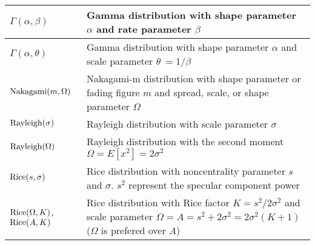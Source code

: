\begin{xltabular}{\textwidth}{XX}
	\(\Gamma(\alpha, \beta)\)                                                    & Gamma distribution with shape parameter \(\alpha\) and rate parameter \(\beta\)                                                                                                                                     \\ \hline
	\(\Gamma(\alpha, \theta)\)                                                   & Gamma distribution with shape parameter \(\alpha\) and scale parameter \(\theta\ = 1/\beta\)                                                                                                                        \\ \hline
	\(\textnormal{Nakagami}(m, \Omega)\)                                         & Nakagami-m distribution with shape parameter or fading figure \(m\) and spread, scale, or shape parameter \(\Omega\)                                                                                                \\ \hline
	\(\textnormal{Rayleigh}(\sigma)\)                                            & Rayleigh distribution with scale parameter \(\sigma\)                                                                                                                                                               \\ \hline
	\(\textnormal{Rayleigh}(\Omega)\)                                            & Rayleigh distribution with the second moment \(\Omega = E\left[ x^2 \right] = 2\sigma^2\)                                                                                                                           \\ \hline
	\(\textnormal{Rice}(s, \sigma)\)                                             & Rice distribution with noncentrality parameter \cite[p. 841]{proakisDigitalCommunications2007} \(s\) and \(\sigma\). \(s^2\) represent the specular component power \cite[p. 841]{proakisDigitalCommunications2007} \\ \hline
	\(\textnormal{Rice}(\Omega, K)\), \(\textnormal{Rice}(A, K)\)                & Rice distribution with Rice factor \(K=s^2/2\sigma^2\) and scale parameter \(\Omega = A = s^2 + 2\sigma^2 = 2\sigma^{2}(K+1)\) (\(\Omega\) is prefered over \(A\))
\end{xltabular}